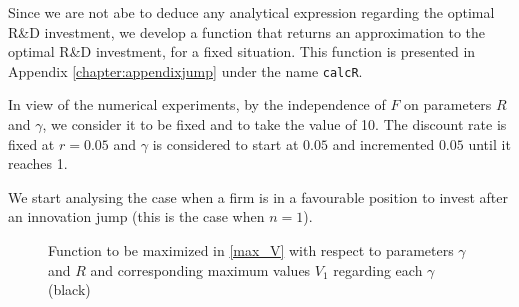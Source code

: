 Since we are not abe to deduce any analytical expression regarding the optimal R\&D investment, we develop a function that returns an approximation to the optimal R\&D investment, for a fixed situation. This function is presented in Appendix \ref{chapter:appendixjump} under the name \texttt{calcR}.

In view of the numerical experiments, by the independence of $F$ on parameters $R$ and $\gamma$, we consider it to be fixed and to take the value of 10. The discount rate is fixed at $r=0.05$ and $\gamma$ is considered to start at $0.05$ and incremented $0.05$ until it reaches 1.




We start analysing the case when a firm is in a favourable position to invest after an innovation jump (this is the case when $n=1$).

\begin{figure}[!htb]
	\begin{subfigmatrix}{2}
		\subfigure[$R \in {(0,1]} $ and $\gamma \in {(0,1]} $. ]{\texttt{[image: Jumps/RgammaV.pdf]}}
	\end{subfigmatrix}
	\caption{Function to be maximized in \eqref{max_V} with respect to parameters $\gamma$ and $R$ and corresponding maximum values $V_1$ regarding each $\gamma$ (black)}
	\label{fig:max_n1}
\end{figure}

